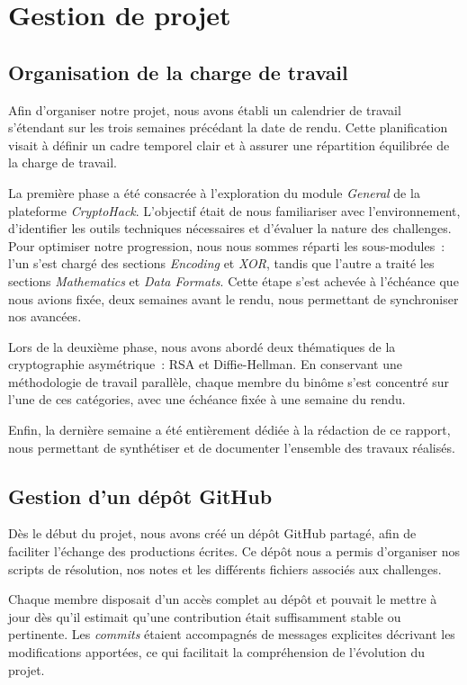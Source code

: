 \section{Gestion de projet}
\subsection{Organisation de la charge de travail}

Afin d'organiser notre projet, nous avons établi un calendrier de travail
s'étendant sur les trois semaines précédant la date de rendu. Cette
planification visait à définir un cadre temporel clair et à assurer une
répartition équilibrée de la charge de travail.

La première phase a été consacrée à l'exploration du module \textit{General}
de la plateforme \textit{CryptoHack}. L'objectif était de nous familiariser
avec l'environnement, d'identifier les outils techniques nécessaires et
d'évaluer la nature des challenges. Pour optimiser notre progression, nous
nous sommes réparti les sous-modules~: l'un s'est chargé des sections
\textit{Encoding} et \textit{XOR}, tandis que l'autre a traité les sections
\textit{Mathematics} et \textit{Data Formats}. Cette étape s'est achevée à
l'échéance que nous avions fixée, deux semaines avant le rendu, nous
permettant de synchroniser nos avancées.

Lors de la deuxième phase, nous avons abordé deux thématiques de la
cryptographie asymétrique~: RSA et Diffie-Hellman. En conservant une
méthodologie de travail parallèle, chaque membre du binôme s'est concentré
sur l'une de ces catégories, avec une échéance fixée à une semaine du rendu.

Enfin, la dernière semaine a été entièrement dédiée à la rédaction de ce
rapport, nous permettant de synthétiser et de documenter l'ensemble des
travaux réalisés.

\subsection{Gestion d'un dépôt GitHub}
Dès le début du projet, nous avons créé un dépôt GitHub partagé, afin de 
faciliter l'échange des productions écrites. Ce
dépôt nous a permis d’organiser nos scripts de résolution, nos notes et les
différents fichiers associés aux challenges.

Chaque membre disposait d’un accès complet au dépôt et pouvait le mettre à
jour dès qu’il estimait qu’une contribution était suffisamment stable ou
pertinente. Les \textit{commits} étaient accompagnés de messages explicites
décrivant les modifications apportées, ce qui facilitait la compréhension
de l’évolution du projet.


